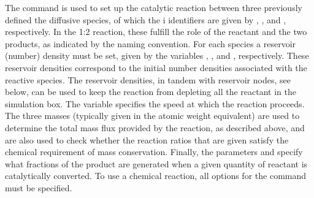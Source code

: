\begin{essyntax}
  \begin{features}
  \end{features}
\end{essyntax}
The  command is used to set up the catalytic 
reaction between three previously defined the diffusive species, of which the i
identifiers are given by , , and 
, respectively. In the 1:2 reaction, these fulfill the role
of the reactant and the two products, as indicated by the naming convention. For
each species a reservoir (number) density must be set, given by the variables
, , and
, respectively. These reservoir densities
correspond to the initial number densities associated with the reactive species.
The reservoir densities, in tandem with reservoir nodes, see below, can be used 
to keep the reaction from depleting all the reactant in the simulation box. The 
 variable specifies the speed at which the reaction proceeds.
The three masses (typically given in the atomic weight equivalent) are used to 
determine the total mass flux provided by the reaction, as described above, and 
are also used to check whether the reaction ratios that are given satisfy the 
chemical requirement of mass conservation. Finally, the parameters
 and  specify
what fractions of the product are generated when a given quantity of reactant is
catalytically converted. To use a chemical reaction, all options for the 
 command must be specified.

